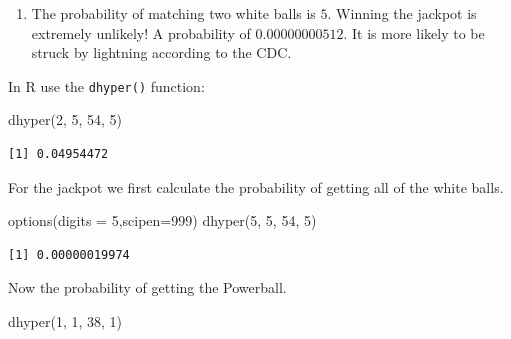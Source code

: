 \documentclass[
  letterpaper,
  DIV=11,
  numbers=noendperiod]{scrreprt}
\newenvironment{Shaded}{\begin{snugshade}}{\end{snugshade}}
\newcommand{\AttributeTok}[1]{\textcolor[rgb]{0.40,0.45,0.13}{#1}}
\newcommand{\DecValTok}[1]{\textcolor[rgb]{0.68,0.00,0.00}{#1}}
\newcommand{\FunctionTok}[1]{\textcolor[rgb]{0.28,0.35,0.67}{#1}}
\newcommand{\NormalTok}[1]{\textcolor[rgb]{0.00,0.23,0.31}{#1}}
\providecommand{\tightlist}{%
  \setlength{\itemsep}{0pt}\setlength{\parskip}{0pt}}\usepackage{longtable,booktabs,array}
\begin{document}
\begin{blackbox}

\begin{enumerate}
\def\labelenumi{\arabic{enumi}.}
\setcounter{enumi}{2}
\tightlist
\item
  The probability of matching two white balls is \(5%
  \). Winning the jackpot is extremely unlikely! A probability of
  \(0.00000000512\). It is more likely to be struck by lightning
  according to the CDC.
\end{enumerate}

\end{blackbox}

In R use the \texttt{dhyper()} function:

\begin{Shaded}
\begin{Highlighting}[numbers=left,,]
\FunctionTok{dhyper}\NormalTok{(}\DecValTok{2}\NormalTok{, }\DecValTok{5}\NormalTok{, }\DecValTok{54}\NormalTok{, }\DecValTok{5}\NormalTok{)}
\end{Highlighting}
\end{Shaded}

\begin{verbatim}
[1] 0.04954472
\end{verbatim}

For the jackpot we first calculate the probability of getting all of the
white balls.

\begin{Shaded}
\begin{Highlighting}[numbers=left,,]
\FunctionTok{options}\NormalTok{(}\AttributeTok{digits =} \DecValTok{5}\NormalTok{,}\AttributeTok{scipen=}\DecValTok{999}\NormalTok{)}
\FunctionTok{dhyper}\NormalTok{(}\DecValTok{5}\NormalTok{, }\DecValTok{5}\NormalTok{, }\DecValTok{54}\NormalTok{, }\DecValTok{5}\NormalTok{)}
\end{Highlighting}
\end{Shaded}

\begin{verbatim}
[1] 0.00000019974
\end{verbatim}

Now the probability of getting the Powerball.

\begin{Shaded}
\begin{Highlighting}[numbers=left,,]
\FunctionTok{dhyper}\NormalTok{(}\DecValTok{1}\NormalTok{, }\DecValTok{1}\NormalTok{, }\DecValTok{38}\NormalTok{, }\DecValTok{1}\NormalTok{)}
\end{Highlighting}
\end{Shaded}
\end{document}
